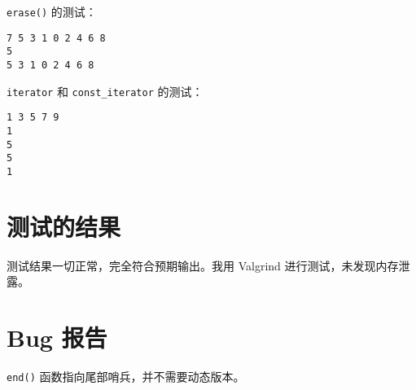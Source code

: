 \documentclass[UTF8]{ctexart}
\begin{document}
\texttt{erase()} 的测试：  
  
\begin{verbatim}  
7 5 3 1 0 2 4 6 8  
5  
5 3 1 0 2 4 6 8  
\end{verbatim}  
  
\texttt{iterator} 和 \texttt{const\_iterator} 的测试：  
  
\begin{verbatim}  
1 3 5 7 9  
1  
5  
5  
1  
\end{verbatim}  
  
\section{测试的结果}  
  
测试结果一切正常，完全符合预期输出。我用 Valgrind 进行测试，未发现内存泄露。  
  
\section{Bug 报告}  
  
\texttt{end()} 函数指向尾部哨兵，并不需要动态版本。  
  
\end{document}

